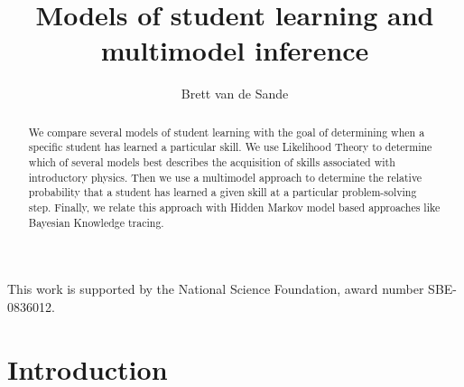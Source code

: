 \documentclass{acmlarge-edm}
\begin{document}

\title{Models of student learning and multimodel inference}
\author{Brett van de Sande
}

%

\begin{abstract}
We compare several models of student learning with the goal of 
determining when a specific student has learned a particular skill.  
We use Likelihood Theory to determine
which of several models best describes the acquisition
of skills associated with introductory physics.  Then we
use a multimodel approach to determine the relative probability
that a student has learned a given skill at a particular 
problem-solving step.  Finally, we relate this
approach with Hidden Markov model based approaches like
Bayesian Knowledge tracing.
\end{abstract}





\begin{bottomstuff}
This work is supported by the National Science Foundation, award
number SBE-0836012.
\end{bottomstuff}


\maketitle


\section{Introduction}

\end{document}
